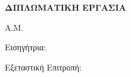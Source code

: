 \thispagestyle{plain}
\begin{center}
\vspace*{1cm}
{\Large\bfseries ΔΙΠΛΩΜΑΤΙΚΗ ΕΡΓΑΣΙΑ\par}
\vspace{1.5em}
{\LARGE\bfseries \thTitleEL\par}
\vspace{0.8em}
{\large\enup{\itshape \thTitleEN}\par}
\vspace{2.5em}
{\Large\bfseries \thAuthorEL\par}
{\large Α.Μ. \thAM\par}
\vspace{2.5em}
{\large Εισηγήτρια:\par}
{\large \thSupervisorEL\par}
\vspace{1.4cm}%
{\large Εξεταστική Επιτροπή:\par}
\vspace{0.4em}
{\large \thExamA\par}
\vspace{1.4cm}
{\large \thExamB\par}
\vspace{1.4cm}
{\large \thExamDateEL\par}
\end{center}
\clearpage
